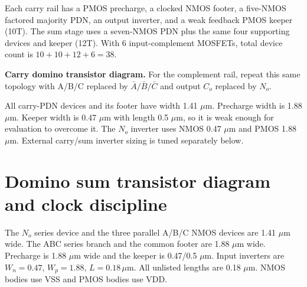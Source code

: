 \documentclass[11pt]{article}
\newcommand{\mos}[4]{\begin{scope}[shift={(#1,#2)}]
\draw (0,.24)--(0,-.24);
\draw (0,.20)--(.25,.20)--(.25,.5);
\draw (0,-.20)--(.25,-.20)--(.25,-.5);
\draw (-.16,.23)--(-.16,-.23);
\ifnum#4=1\draw (-.26,0) circle (.06);\draw (-.75,0)--(-.32,0);\else\draw (-.75,0)--(-.16,0);\fi
\node[anchor=east,font=\small] at (-.76,0) {$#3$};
\end{scope}}
\newcommand{\ground}[2]{\draw (#1,#2)--(#1,{#2-.12});\draw ({#1-.17},{#2-.12})--({#1+.17},{#2-.12});\draw ({#1-.11},{#2-.20})--({#1+.11},{#2-.20});}
\newcommand{\rail}[3]{\draw (#1,#2)--(#1,{#2+.15});\node[above,font=\small] at (#1,{#2+.15}) {$#3$};}
\newcommand{\outputnode}[3]{\fill (#1,#2) circle (.04);\draw (#1,#2)--({#1+.7},#2) node[right] {$#3$};}
\begin{document}
Each carry rail has a PMOS precharge, a clocked NMOS footer, a five-NMOS factored majority PDN, an output inverter, and a weak feedback PMOS keeper (10T). The sum stage uses a seven-NMOS PDN plus the same four supporting devices and keeper (12T). With 6 input-complement MOSFETs, total device count is $10+10+12+6=38$.

\textbf{Carry domino transistor diagram.} For the complement rail, repeat this same topology with A/B/C replaced by $\bar A/\bar B/\bar C$ and output $C_o$ replaced by $N_o$.
\begin{center}\end{center}
All carry-PDN devices and its footer have width 1.41 $\mu$m. Precharge width is 1.88 $\mu$m. Keeper width is 0.47 $\mu$m with length 0.5 $\mu$m, so it is weak enough for evaluation to overcome it. The $N_o$ inverter uses NMOS 0.47 $\mu$m and PMOS 1.88 $\mu$m. External carry/sum inverter sizing is tuned separately below.

\newpage\section*{Domino sum transistor diagram and clock discipline}
\begin{center}\end{center}
The $N_o$ series device and the three parallel A/B/C NMOS devices are 1.41 $\mu$m wide. The ABC series branch and the common footer are 1.88 $\mu$m wide. Precharge is 1.88 $\mu$m wide and the keeper is 0.47/0.5 $\mu$m. Input inverters are $W_n=0.47$, $W_p=1.88$, $L=0.18\,\mu$m. All unlisted lengths are 0.18 $\mu$m. NMOS bodies use VSS and PMOS bodies use VDD.
\end{document}
